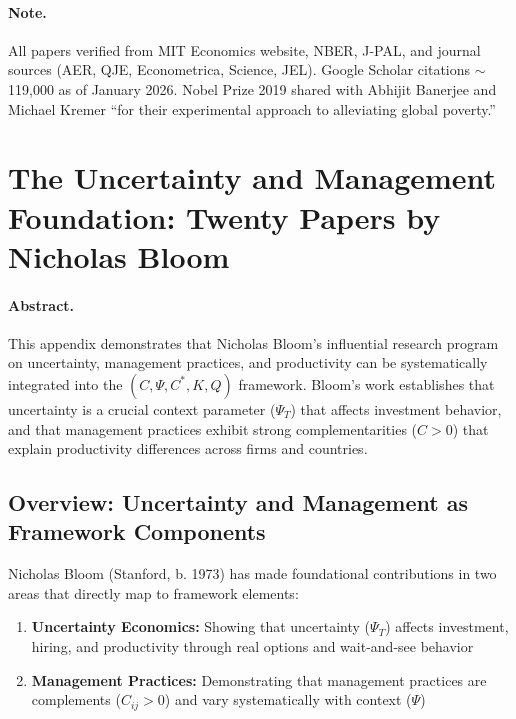 \documentclass[12pt,a4paper]{article}
\begin{document}
\paragraph{Note.} 
All papers verified from MIT Economics website, NBER, J-PAL, and journal
sources (AER, QJE, Econometrica, Science, JEL). Google Scholar citations $\sim$119,000
as of January 2026. Nobel Prize 2019 shared with Abhijit Banerjee and Michael Kremer
``for their experimental approach to alleviating global poverty.''

\section{The Uncertainty and Management Foundation: Twenty Papers by Nicholas Bloom}
\label{app:bloom}

\paragraph{Abstract.}
This appendix demonstrates that Nicholas Bloom's influential research program on
uncertainty, management practices, and productivity can be systematically integrated
into the $(C, \Psi, C^*, K, Q)$ framework. Bloom's work establishes that uncertainty
is a crucial context parameter ($\Psi_T$) that affects investment behavior, and that
management practices exhibit strong complementarities ($C > 0$) that explain 
productivity differences across firms and countries.

\subsection{Overview: Uncertainty and Management as Framework Components}

Nicholas Bloom (Stanford, b. 1973) has made foundational contributions in two areas
that directly map to framework elements:
\begin{enumerate}
  \item \textbf{Uncertainty Economics:} Showing that uncertainty ($\Psi_T$) affects
        investment, hiring, and productivity through real options and wait-and-see behavior
  \item \textbf{Management Practices:} Demonstrating that management practices are
        complements ($C_{ij} > 0$) and vary systematically with context ($\Psi$)
\end{enumerate}
\end{document}

